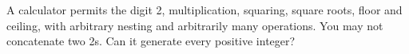 A calculator permits the digit 2, multiplication, squaring, square roots, floor and ceiling, with arbitrary nesting and arbitrarily many operations. You may not concatenate two 2s. Can it generate every positive integer?
